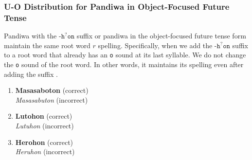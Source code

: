 \subsubsection{U-O Distribution for Pandiwa in Object-Focused Future Tense}

Pandiwa with the $\texttt{-h}^?\texttt{on}$ suffix or pandiwa in the object-focused future tense form maintain the same root word $r$ spelling. Specifically, when we add the $\texttt{-h}^?\texttt{on}$ suffix to a root word that already has an \texttt{o} sound at its last syllable. We do not change the \texttt{o} sound of the root word. In other words, it maintains its spelling even after adding the suffix \cite{bikol_dictionary}.

\begin{example}
\end{example}

\begin{enumerate}
      \item \textbf{Masasaboton} (correct) \\
            \textit{Masasabuton} (incorrect)
      \item \textbf{Lutohon} (correct) \\
            \textit{Lutuhon} (incorrect)
      \item \textbf{Herohon} (correct) \\
            \textit{Heruhon} (incorrect)
\end{enumerate}
